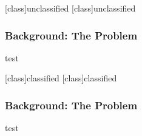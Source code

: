 \documentclass[t]{beamer}
\begin{document}
    [class]{unclassified}
    [class]{unclassified}
    \begin{frame}
        \frametitle{Background:  The Problem}
        test
    \end{frame}

    [class]{classified}
    [class]{classified}
    \begin{frame}
        \frametitle{Background:  The Problem}
        test
    \end{frame}
\end{document}

